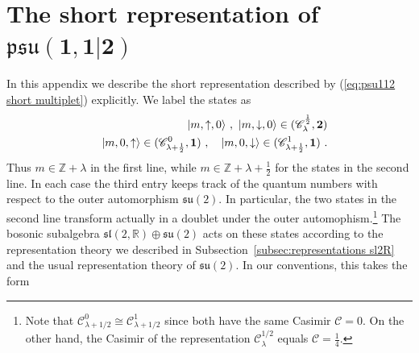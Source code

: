 \documentclass[12pt,a4paper]{article}
\newcommand{\ket}[1]{| #1\rangle}
\begin{document}
\section{The short representation of $\boldsymbol{\mathfrak{psu}(1,1|2)}$} \label{app:short representation}

In this appendix we describe the short representation described by (\ref{eq:psu112 short multiplet}) explicitly. We label the states as
\begin{eqnarray}
& & \ket{m,\uparrow,0}\ , \ \ket{m,\downarrow,0}  \in (\mathscr{C}^{\frac{1}{2}}_\lambda ,{\bf 2}) \\
& & \ket{m,0,\uparrow} \in (\mathscr{C}^{0}_{\lambda +\frac{1}{2}},{\bf 1}) \ , \quad
\ket{m,0,\downarrow} \in (\mathscr{C}^{1}_{\lambda +\frac{1}{2}},{\bf 1}) \ . 
\end{eqnarray}
Thus $m \in \mathds{Z}+\lambda$ in the first line, while $m \in \mathds{Z}+\lambda+\frac{1}{2}$ for the states in the second line. In each case the third entry keeps track of the quantum numbers with respect to the outer automorphism $\mathfrak{su}(2)$. In particular, the two states in the second line transform actually in a doublet under the outer automophism.\footnote{Note that $\mathscr{C}^{0}_{\lambda +1/2} \cong \mathscr{C}^{1}_{\lambda +1/2}$ since both have the same Casimir $\mathcal{C}=0$. On the other hand, the Casimir of the representation $\mathscr{C}^{1/2}_{\lambda }$ equals $\mathcal{C}=\tfrac{1}{4}$.}
 The bosonic subalgebra $\mathfrak{sl}(2,\mathds{R}) \oplus \mathfrak{su}(2)$ acts on these states according to the representation theory we described in Subsection~\ref{subsec:representations sl2R} and the usual representation theory of $\mathfrak{su}(2)$. In our conventions, this takes the form
\end{document}
